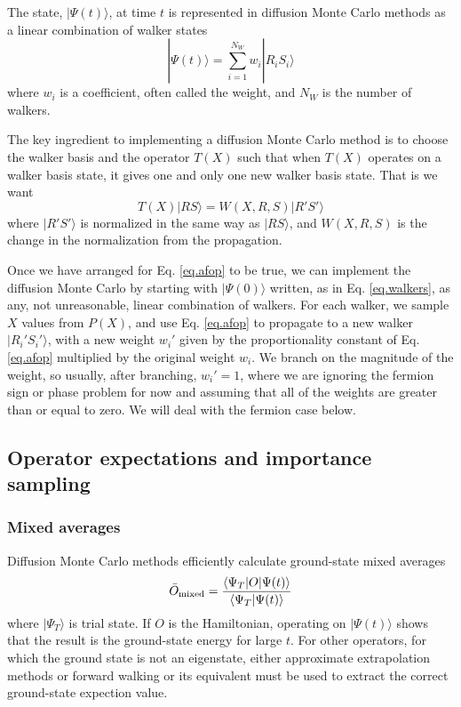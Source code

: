 The state,
$|\Psi(t)\rangle$, at
time $t$ is represented in diffusion Monte Carlo methods as a
linear combination of walker states
\begin{equation}
\label{eq.walkers}
|\Psi(t)\rangle = \sum_{i=1}^{N_W} w_i |R_i S_i\rangle
\end{equation}
where $w_i$ is a coefficient, often called the weight, and $N_W$ is the
number of walkers.

The key ingredient to implementing a diffusion Monte Carlo method is
to choose the walker basis and the operator $T(X)$ such that when
$T(X)$ operates on a walker basis state, it gives one and only one
new walker basis state. That is we want
\begin{equation}
\label{eq.afop}
T(X) |R S\rangle = W(X,R,S) |R' S'\rangle
\end{equation}
where $|R' S'\rangle$ is normalized in the same way as $|RS\rangle$,
and $W(X,R,S)$ is the change in the normalization from the propagation.

Once we have arranged for Eq. \ref{eq.afop} to be true, we can implement
the diffusion Monte Carlo by starting with $|\Psi(0)\rangle$ written, as
in Eq. \ref{eq.walkers}, as any, not
unreasonable, linear combination of walkers. For each walker, we sample
$X$ values from $P(X)$, and use Eq. \ref{eq.afop} to propagate to a new
walker $|R_i' S_i'\rangle$, with a new weight $w_i'$
given by the proportionality
constant of Eq. \ref{eq.afop} multiplied by
the original weight $w_i$. We branch on the magnitude of the weight,
so usually, after branching, $w_i'=1$, where we are ignoring the
fermion sign or phase problem for now and assuming that all of the
weights are greater than or equal to zero. We will deal with the
fermion case below.

\subsection{Operator expectations and importance sampling}
\subsubsection{Mixed averages}
Diffusion Monte Carlo methods efficiently calculate ground-state
mixed averages
\begin{equation}
\bar O_{\rm mixed} = \frac{\langle \Psi_T | O |\Psi(t)\rangle}{\langle
\Psi_T|\Psi(t)\rangle}
\end{equation}
where $|\Psi_T\rangle $ is  trial state.
If $O$ is the Hamiltonian, operating on $|\Psi(t)\rangle$ shows
that the result
is the ground-state energy for large $t$. For other operators, for which
the ground state is not an eigenstate, either
approximate extrapolation methods or forward walking or its equivalent
must be used to extract the correct ground-state expection value.

